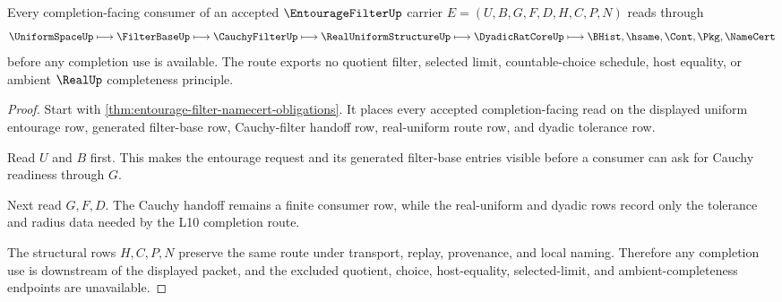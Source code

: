 \begin{theorem}
\label{thm:entourage-filter-cauchy-handoff}
Every completion-facing consumer of an accepted $\EntourageFilterUp$ carrier $E=(U,B,G,F,D,H,C,P,N)$ reads through
$$
\UniformSpaceUp
\longmapsto
\FilterBaseUp
\longmapsto
\CauchyFilterUp
\longmapsto
\RealUniformStructureUp
\longmapsto
\DyadicRatCoreUp
\longmapsto
\BHist,\hsame,\Cont,\Pkg,\NameCert
$$
before any completion use is available. The route exports no quotient filter, selected limit, countable-choice schedule, host equality, or ambient $\RealUp$ completeness principle.
\end{theorem}
\begin{proof}
Start with \autoref{thm:entourage-filter-namecert-obligations}. It places every accepted completion-facing read on the displayed uniform entourage row, generated filter-base row, Cauchy-filter handoff row, real-uniform route row, and dyadic tolerance row.

Read $U$ and $B$ first. This makes the entourage request and its generated filter-base entries visible before a consumer can ask for Cauchy readiness through $G$.

Next read $G,F,D$. The Cauchy handoff remains a finite consumer row, while the real-uniform and dyadic rows record only the tolerance and radius data needed by the L10 completion route.

The structural rows $H,C,P,N$ preserve the same route under transport, replay, provenance, and local naming. Therefore any completion use is downstream of the displayed packet, and the excluded quotient, choice, host-equality, selected-limit, and ambient-completeness endpoints are unavailable.
\end{proof}



